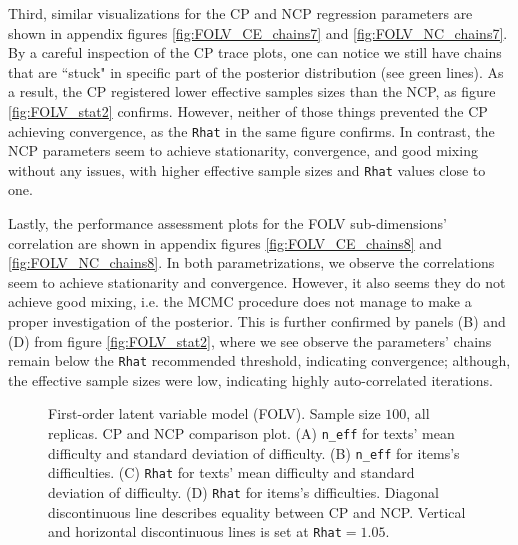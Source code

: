 Third, similar visualizations for the CP and NCP regression parameters are shown in appendix figures \ref{fig:FOLV_CE_chains7} and \ref{fig:FOLV_NC_chains7}. By a careful inspection of the CP trace plots, one can notice we still have chains that are ``stuck" in specific part of the posterior distribution (see green lines). As a result, the CP registered lower effective samples sizes than the NCP, as figure \ref{fig:FOLV_stat2} confirms. However, neither of those things prevented the CP achieving convergence, as the \texttt{Rhat} in the same figure confirms. In contrast, the NCP parameters seem to achieve stationarity, convergence, and good mixing without any issues, with higher effective sample sizes and \texttt{Rhat} values close to one.

Lastly, the performance assessment plots for the FOLV sub-dimensions' correlation are shown in appendix figures \ref{fig:FOLV_CE_chains8} and \ref{fig:FOLV_NC_chains8}. In both parametrizations, we observe the correlations seem to achieve stationarity and convergence. However, it also seems they do not achieve good mixing, i.e. the MCMC procedure does not manage to make a proper investigation of the posterior. This is further confirmed by panels (B) and (D) from figure \ref{fig:FOLV_stat2}, where we see observe the parameters' chains remain below the \texttt{Rhat} recommended threshold, indicating convergence; although, the effective sample sizes were low, indicating highly auto-correlated iterations. 
%
\begin{figure}[H]
	\centering
	\begin{subfigure}
		\texttt{[image: FOLV\_100\_neff1]}
	\end{subfigure}
	\begin{subfigure}
		\texttt{[image: FOLV\_100\_Rhat1]}
	\end{subfigure}
	\caption[First-order latent variable model (FOLV). Sample size $100$, all replicas. CP and NCP comparison plot.]%
	{First-order latent variable model (FOLV). Sample size $100$, all replicas. CP and NCP comparison plot. (A) \texttt{n\_eff} for texts' mean difficulty and standard deviation of difficulty. (B) \texttt{n\_eff} for items's difficulties. (C) \texttt{Rhat} for texts' mean difficulty and standard deviation of difficulty. (D) \texttt{Rhat} for items's difficulties. Diagonal discontinuous line describes equality between CP and NCP. Vertical and horizontal discontinuous lines is set at \texttt{Rhat}$=1.05$. }
	\label{fig:FOLV_stat1}
\end{figure}


